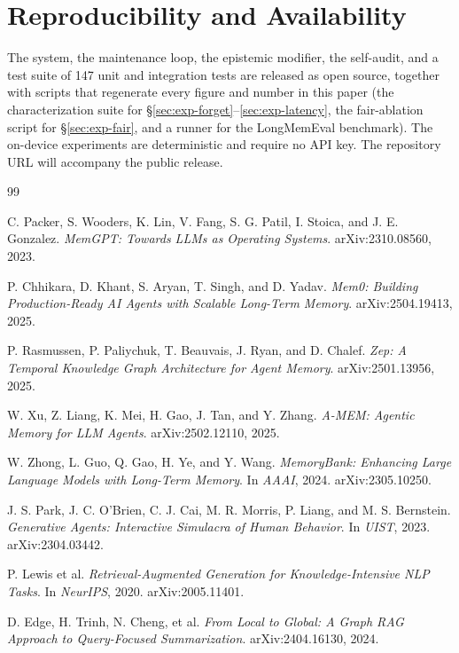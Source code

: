 \documentclass[11pt]{article}
\theoremstyle{definition}
\begin{document}
\section*{Reproducibility and Availability}
The system, the maintenance loop, the epistemic modifier, the self-audit, and a
test suite of 147 unit and integration tests are released as open source,
together with scripts that regenerate every figure and number in this paper
(the characterization suite for \S\ref{sec:exp-forget}--\ref{sec:exp-latency},
the fair-ablation script for \S\ref{sec:exp-fair}, and a runner for the
LongMemEval benchmark). The on-device experiments are deterministic and require
no API key. The repository URL will accompany the public release.

\begin{thebibliography}{99}
\small

 C. Packer, S. Wooders, K. Lin, V. Fang, S. G. Patil, I. Stoica,
and J. E. Gonzalez. \emph{MemGPT: Towards LLMs as Operating Systems}.
arXiv:2310.08560, 2023.

 P. Chhikara, D. Khant, S. Aryan, T. Singh, and D. Yadav.
\emph{Mem0: Building Production-Ready AI Agents with Scalable Long-Term Memory}.
arXiv:2504.19413, 2025.

 P. Rasmussen, P. Paliychuk, T. Beauvais, J. Ryan, and D. Chalef.
\emph{Zep: A Temporal Knowledge Graph Architecture for Agent Memory}.
arXiv:2501.13956, 2025.

 W. Xu, Z. Liang, K. Mei, H. Gao, J. Tan, and Y. Zhang.
\emph{A-MEM: Agentic Memory for LLM Agents}. arXiv:2502.12110, 2025.

 W. Zhong, L. Guo, Q. Gao, H. Ye, and Y. Wang.
\emph{MemoryBank: Enhancing Large Language Models with Long-Term Memory}.
In \emph{AAAI}, 2024. arXiv:2305.10250.

 J. S. Park, J. C. O'Brien, C. J. Cai, M. R. Morris,
P. Liang, and M. S. Bernstein. \emph{Generative Agents: Interactive Simulacra of
Human Behavior}. In \emph{UIST}, 2023. arXiv:2304.03442.

 P. Lewis et al. \emph{Retrieval-Augmented Generation for
Knowledge-Intensive NLP Tasks}. In \emph{NeurIPS}, 2020. arXiv:2005.11401.

 D. Edge, H. Trinh, N. Cheng, et al. \emph{From Local to
Global: A Graph RAG Approach to Query-Focused Summarization}. arXiv:2404.16130,
2024.


\end{thebibliography}
\end{document}
